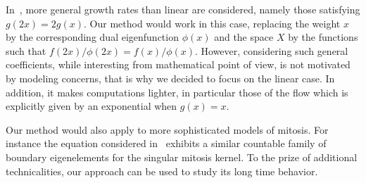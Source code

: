 \documentclass[AHL,Unicode,longabstracts,published]{cedram}
\newcommand{\1}{\mathds{1}}
\begin{document}
In~\cite{GreinerNagel}, more general growth rates than linear are considered, namely those satisfying $g(2x)=2g(x).$ Our method would work in this case, replacing the weight $x$ by the corresponding dual eigenfunction $\phi(x)$ and the space $X$ by the functions such that $f(2x)/\phi(2x)=f(x)/\phi(x)$. However, considering such general coefficients, while interesting from mathematical point of view, is not motivated by modeling concerns, that is why we decided to focus on the linear case. In addition, it makes computations lighter, in particular those of the flow which is explicitly given by an exponential when $g(x) = x$.


Our method would also apply to more sophisticated models of mitosis. For instance the equation considered in~\cite{Gabriel2019} exhibits a similar countable family of boundary eigenelements for the singular mitosis kernel. To the prize of additional technicalities, our approach can be used to study its long time behavior.

\vspace{80pt} 


\end{document}
